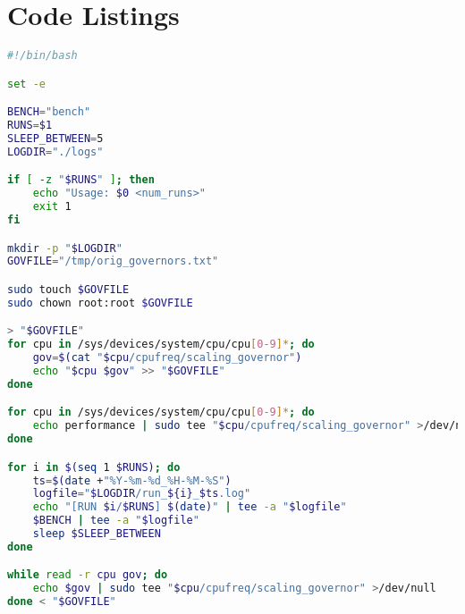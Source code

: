 \section{Code Listings}

\begin{lstlisting}[language=bash,caption={Automation script for benchmark runs},
label={lst:run-measurements}]
#!/bin/bash

set -e

BENCH="bench"
RUNS=$1
SLEEP_BETWEEN=5
LOGDIR="./logs"

if [ -z "$RUNS" ]; then
    echo "Usage: $0 <num_runs>"
    exit 1
fi

mkdir -p "$LOGDIR"
GOVFILE="/tmp/orig_governors.txt"

sudo touch $GOVFILE
sudo chown root:root $GOVFILE

> "$GOVFILE"
for cpu in /sys/devices/system/cpu/cpu[0-9]*; do
    gov=$(cat "$cpu/cpufreq/scaling_governor")
    echo "$cpu $gov" >> "$GOVFILE"
done

for cpu in /sys/devices/system/cpu/cpu[0-9]*; do
    echo performance | sudo tee "$cpu/cpufreq/scaling_governor" >/dev/null
done

for i in $(seq 1 $RUNS); do
    ts=$(date +"%Y-%m-%d_%H-%M-%S")
    logfile="$LOGDIR/run_${i}_$ts.log"
    echo "[RUN $i/$RUNS] $(date)" | tee -a "$logfile"
    $BENCH | tee -a "$logfile"
    sleep $SLEEP_BETWEEN
done

while read -r cpu gov; do
    echo $gov | sudo tee "$cpu/cpufreq/scaling_governor" >/dev/null
done < "$GOVFILE"
\end{lstlisting}
\clearpage
